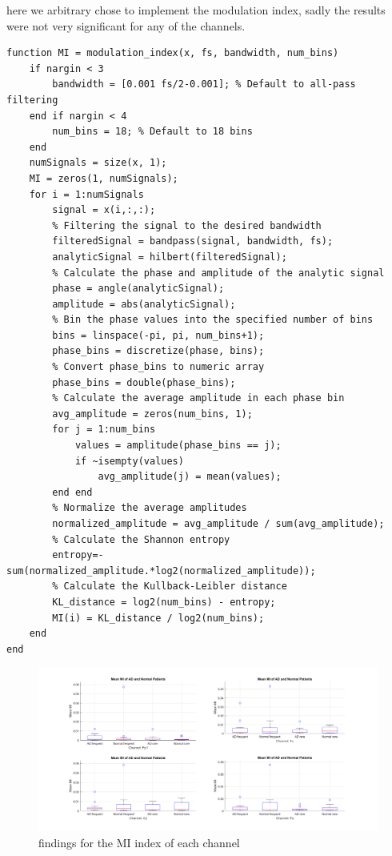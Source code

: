 \documentclass[12pt]{article}
\begin{document}
\begin{qsolve}[]
	here we arbitrary chose to implement the modulation index, sadly the results were not very significant for
	any of the channels.
\end{qsolve}

\begin{lstlisting}[style=matlab-editor, basicstyle=\small]
function MI = modulation_index(x, fs, bandwidth, num_bins)
    if nargin < 3
        bandwidth = [0.001 fs/2-0.001]; % Default to all-pass filtering
    end if nargin < 4
        num_bins = 18; % Default to 18 bins
    end
    numSignals = size(x, 1);
    MI = zeros(1, numSignals);
    for i = 1:numSignals
        signal = x(i,:,:);
        % Filtering the signal to the desired bandwidth
        filteredSignal = bandpass(signal, bandwidth, fs);
        analyticSignal = hilbert(filteredSignal);
        % Calculate the phase and amplitude of the analytic signal
        phase = angle(analyticSignal);
        amplitude = abs(analyticSignal);
        % Bin the phase values into the specified number of bins
        bins = linspace(-pi, pi, num_bins+1);
        phase_bins = discretize(phase, bins);
        % Convert phase_bins to numeric array
        phase_bins = double(phase_bins);
        % Calculate the average amplitude in each phase bin
        avg_amplitude = zeros(num_bins, 1);
        for j = 1:num_bins
            values = amplitude(phase_bins == j);
            if ~isempty(values)
                avg_amplitude(j) = mean(values);
        end end
        % Normalize the average amplitudes
        normalized_amplitude = avg_amplitude / sum(avg_amplitude);
        % Calculate the Shannon entropy
        entropy=-sum(normalized_amplitude.*log2(normalized_amplitude));
        % Calculate the Kullback-Leibler distance
        KL_distance = log2(num_bins) - entropy;
        MI(i) = KL_distance / log2(num_bins);
    end
end\end{lstlisting}

\begin{figure}[h!]
	\centering
	\includegraphics*[width=\linewidth]{../computation/MCI/results/boxplot_MI.png}
	\caption{findings for the MI index of each channel}
\end{figure}
\end{document}
